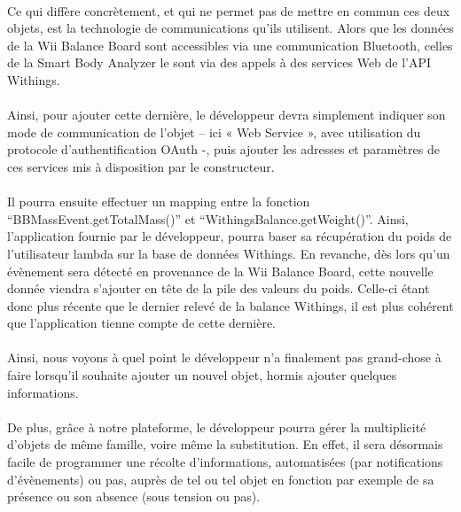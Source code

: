 \documentclass[nocopyrightspace]{sigplanconf}
\begin{document}
	\paragraph{}
	Ce qui diffère concrètement, et qui ne permet pas de mettre en commun ces deux objets, est la technologie de communications qu’ils utilisent. Alors que les données de la Wii Balance Board\cite{wiiboardapi} sont accessibles via une communication Bluetooth, celles de la Smart Body Analyzer le sont via des appels à des services Web de l’API Withings.


	\paragraph{}
	Ainsi, pour ajouter cette dernière, le développeur devra simplement indiquer son mode de communication de l’objet – ici « Web Service », avec utilisation du protocole d’authentification OAuth\cite{oauth} -, puis ajouter les adresses et paramètres de ces services mis à disposition par le constructeur. 

	\paragraph{}
	Il pourra ensuite effectuer un mapping entre la fonction “BBMassEvent.getTotalMass()” et “WithingsBalance.getWeight()”. Ainsi, l’application fournie par le développeur, pourra baser sa récupération du poids de l’utilisateur lambda sur la base de données Withings. En revanche, dès lors qu’un évènement sera détecté en provenance de la Wii Balance Board, cette nouvelle donnée viendra s’ajouter en tête de la pile des valeurs du poids. Celle-ci étant donc plus récente que le dernier relevé de la balance Withings, il est plus cohérent que l’application tienne compte de cette dernière.

	\paragraph{}
	Ainsi, nous voyons à quel point le développeur n’a finalement pas grand-chose à faire lorsqu’il souhaite ajouter un nouvel objet, hormis ajouter quelques informations.

	\paragraph{}
	De plus, grâce à notre plateforme, le développeur pourra gérer la multiplicité d’objets de même famille, voire même la substitution. En effet, il sera désormais facile de programmer une récolte d’informations, automatisées (par notifications d’évènements) ou pas, auprès de tel ou tel objet en fonction par exemple de sa présence ou son absence (sous tension ou pas).
\end{document}
